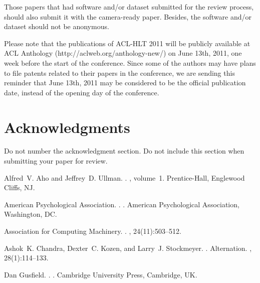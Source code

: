 \documentclass[11pt]{article}
\begin{document}
Those papers that had software and/or dataset submitted for the review process, should also submit it 
with the camera-ready paper. Besides, the software and/or dataset should not be anonymous. 

Please note that the publications of ACL-HLT 2011 will be publicly available at ACL Anthology 
(http://aclweb.org/anthology-new/) on June 13th, 2011, one week before the start of the conference. 
Since some of the authors may have plans to file patents related to their papers in the conference, 
we are sending this reminder that June 13th, 2011 may be considered to be the official publication date, 
instead of the opening day of the conference.

\section*{Acknowledgments}

Do not number the acknowledgment section. Do not include this section when submitting your paper for review.

\begin{thebibliography}{}

Alfred~V. Aho and Jeffrey~D. Ullman.
.
, volume~1.
\newblock Prentice-{Hall}, Englewood Cliffs, NJ.

{American Psychological Association}.
.
.
\newblock American Psychological Association, Washington, DC.

{Association for Computing Machinery}.
.
, 24(11):503--512.

Ashok~K. Chandra, Dexter~C. Kozen, and Larry~J. Stockmeyer.
.
\newblock Alternation.
,
  28(1):114--133.

Dan Gusfield.
.
.
\newblock Cambridge University Press, Cambridge, UK.

\end{thebibliography}
\end{document}
